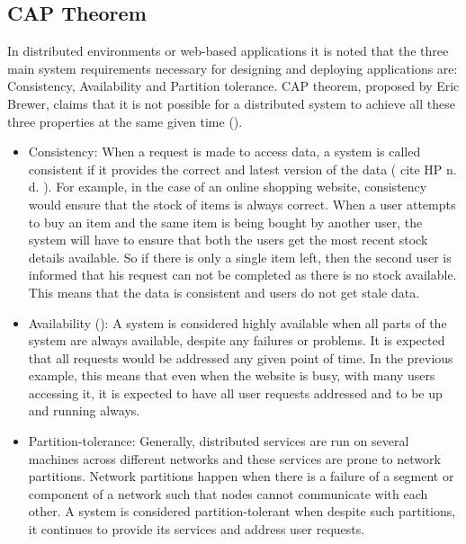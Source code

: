 \subsection{CAP Theorem} \label{ss:cap}
In distributed environments or web-based applications it is noted that the three
main system requirements necessary for designing and deploying applications are:
Consistency,   Availability and Partition tolerance.  CAP theorem, proposed by
Eric Brewer, claims that it is not possible for a distributed system to achieve
all these three properties at the same given time ().

\begin{itemize}
  
	\item Consistency: When a request is made to access data,   a system is called
	consistent if it provides the correct and latest version of the data (\todo
	{cite HP n. d. }).  For example,   in the case of an online shopping website,
	consistency would ensure that the stock of items is always correct.  When a user
	attempts to buy an item and the same item is being bought by another user,   the
	system will have to ensure that both the users get the most recent stock details
	available.  So if there is only a single item left,   then the second user is
	informed that his request can not be completed as there is no stock available. 
	This means that the data is consistent and users do not get stale data.
	
	\item Availability (): A system is considered
	highly available when all parts of the system are always available, despite any
	failures or problems.  It is expected that all requests would be addressed any
	given point of time.  In the previous example,   this means that even when the
	website is busy,   with many users accessing it,   it is expected to have all
	user requests addressed and to be up and running always.
		
	\item Partition-tolerance: Generally, distributed services are run on several
	machines across different networks and these services are prone to network
	partitions. Network partitions happen when there is a failure of a segment or
	component of a network such that nodes cannot communicate with each other.
	A system is considered  partition-tolerant when despite such partitions,   it
	continues to provide its services and address user requests.
	
\end{itemize}

